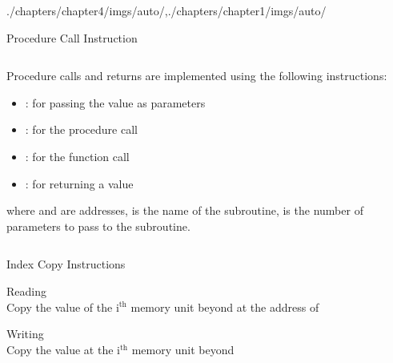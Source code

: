 \begin{graphicspathcontext}{{./chapters/chapter4/imgs/auto/},{./chapters/chapter1/imgs/auto/}}
\begin{bibunit}[apalike]
\begin{frame}[background=9]{Procedure Call Instruction}
	\begin{columns}
		\begin{column}{.8\linewidth}
		\begin{small}
		Procedure calls and returns are implemented using the following instructions:
		\vfill
		\begin{itemize}
		\item {}: for passing the value  as parameters
		\vfill
		\item {}: for the procedure call
		\vfill
		\item {}: for the function call
		\vfill
		\item {}: for returning a value
		\end{itemize}
		\vfill
		where  and  are addresses,  is the name of the subroutine,  is the number of parameters to pass to the subroutine.
		\end{small}
		\end{column}
		\begin{column}{.2\linewidth}
			\begin{tac}[\linewidth]
				\tacdots
			\end{tac}
		\end{column}
	\end{columns}
	\vfill
\end{frame}

\begin{frame}{{Index Copy} Instructions}
	\begin{definitionblock}{Reading}
		\emph{} \\
		Copy the value of the i$^{\text{th}}$ memory unit beyond  at the address of 
	\end{definitionblock}
	\vspace{1cm}
	\begin{definitionblock}{Writing}
	\emph{} \\
	Copy the value  at the i$^{\text{th}}$ memory unit beyond 
	\end{definitionblock}
\end{frame}


\end{bibunit}
\end{graphicspathcontext}
